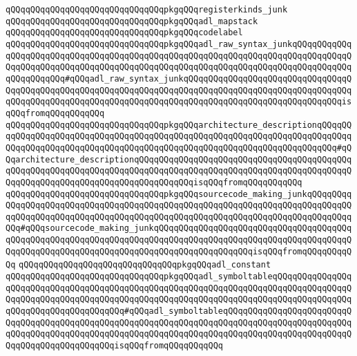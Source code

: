 \newline
\verb|qQQqqQQqqQQqqQQqqQQqqQQqqQQqqQQqpkgqQQqregisterkinds_junk|\newline
\verb|qQQqqQQqqQQqqQQqqQQqqQQqqQQqqQQqpkgqQQqadl_mapstack|\newline
\verb|qQQqqQQqqQQqqQQqqQQqqQQqqQQqqQQqpkgqQQqcodelabel|\newline
\verb|qQQqqQQqqQQqqQQqqQQqqQQqqQQqqQQqpkgqQQqadl_raw_syntax_junkqQQqqQQqqQQqqQQqqQQqqQQqqQQqqQQqqQQqqQQqqQQqqQQqqQQqqQQqqQQqqQQqqQQqqQQqqQQqqQQqqQQqqQQqqQQqqQQqqQQqqQQqqQQqqQQqqQQqqQQqqQQqqQQqqQQqqQQqqQQqqQQqqQQqqQQqqQQqqQQqqQQq#qQQqadl_raw_syntax_junkqQQqqQQqqQQqqQQqqQQqqQQqqQQqqQQqqQQqqQQqqQQqqQQqqQQqqQQqqQQqqQQqqQQqqQQqqQQqqQQqqQQqqQQqqQQqqQQqqQQqqQQqqQQqqQQqqQQqqQQqqQQqqQQqqQQqqQQqqQQqqQQqqQQqqQQqqQQqqQQqqQQqqQQqqQQqisqQQqfromqQQqqQQqqQQq|\newline
\verb|qQQqqQQqqQQqqQQqqQQqqQQqqQQqqQQqpkgqQQqarchitecture_descriptionqQQqqQQqqQQqqQQqqQQqqQQqqQQqqQQqqQQqqQQqqQQqqQQqqQQqqQQqqQQqqQQqqQQqqQQqqQQqqQQqqQQqqQQqqQQqqQQqqQQqqQQqqQQqqQQqqQQqqQQqqQQqqQQqqQQqqQQqqQQqqQQq#qQQqarchitecture_descriptionqQQqqQQqqQQqqQQqqQQqqQQqqQQqqQQqqQQqqQQqqQQqqQQqqQQqqQQqqQQqqQQqqQQqqQQqqQQqqQQqqQQqqQQqqQQqqQQqqQQqqQQqqQQqqQQqqQQqqQQqqQQqqQQqqQQqqQQqqQQqqQQqqQQqqQQqisqQQqfromqQQqqQQqqQQq|\newline
\verb|qQQqqQQqqQQqqQQqqQQqqQQqqQQqqQQqpkgqQQqsourcecode_making_junkqQQqqQQqqQQqqQQqqQQqqQQqqQQqqQQqqQQqqQQqqQQqqQQqqQQqqQQqqQQqqQQqqQQqqQQqqQQqqQQqqQQqqQQqqQQqqQQqqQQqqQQqqQQqqQQqqQQqqQQqqQQqqQQqqQQqqQQqqQQqqQQqqQQqqQQq#qQQqsourcecode_making_junkqQQqqQQqqQQqqQQqqQQqqQQqqQQqqQQqqQQqqQQqqQQqqQQqqQQqqQQqqQQqqQQqqQQqqQQqqQQqqQQqqQQqqQQqqQQqqQQqqQQqqQQqqQQqqQQqqQQqqQQqqQQqqQQqqQQqqQQqqQQqqQQqqQQqqQQqqQQqqQQqisqQQqfromqQQqqQQqqQQq|\newline
\verb|qQQqqQQqqQQqqQQqqQQqqQQqqQQqqQQqpkgqQQqadl_constant|\newline
\verb|qQQqqQQqqQQqqQQqqQQqqQQqqQQqqQQqpkgqQQqadl_symboltableqQQqqQQqqQQqqQQqqQQqqQQqqQQqqQQqqQQqqQQqqQQqqQQqqQQqqQQqqQQqqQQqqQQqqQQqqQQqqQQqqQQqqQQqqQQqqQQqqQQqqQQqqQQqqQQqqQQqqQQqqQQqqQQqqQQqqQQqqQQqqQQqqQQqqQQqqQQqqQQqqQQqqQQqqQQqqQQqqQQq#qQQqadl_symboltableqQQqqQQqqQQqqQQqqQQqqQQqqQQqqQQqqQQqqQQqqQQqqQQqqQQqqQQqqQQqqQQqqQQqqQQqqQQqqQQqqQQqqQQqqQQqqQQqqQQqqQQqqQQqqQQqqQQqqQQqqQQqqQQqqQQqqQQqqQQqqQQqqQQqqQQqqQQqqQQqqQQqqQQqqQQqqQQqqQQqqQQqqQQqisqQQqfromqQQqqQQqqQQq|\newline
